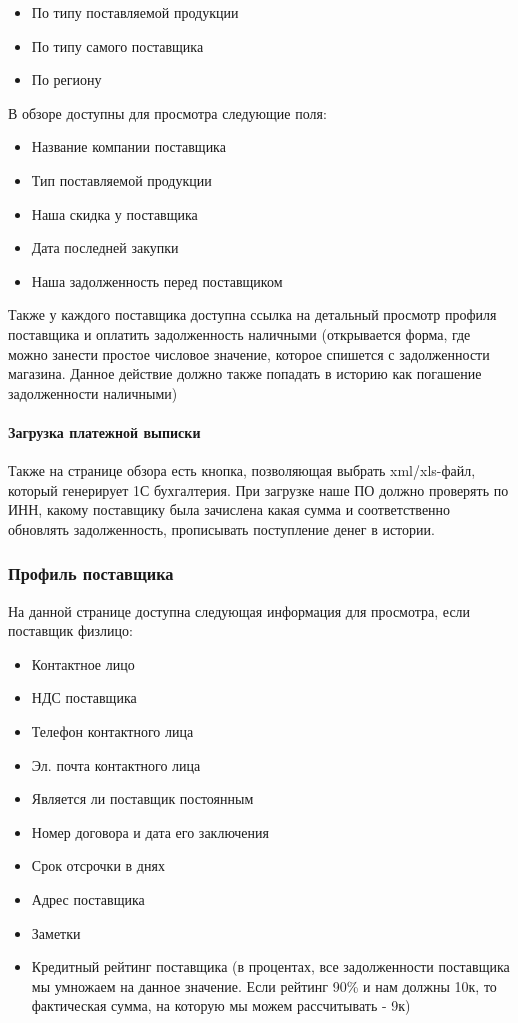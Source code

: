 \documentclass[DIV=calc, paper=a4, fontsize=11pt]{scrartcl} %
\begin{document}
\begin{itemize}
	\item По типу поставляемой продукции
	\item По типу самого поставщика 
	\item По региону
\end{itemize}

В обзоре доступны для просмотра следующие поля:

\begin{itemize}
	\item Название компании поставщика
	\item Тип поставляемой продукции
	\item Наша скидка у поставщика
	\item Дата последней закупки
	\item Наша задолженность перед поставщиком
\end{itemize}

Также у каждого поставщика доступна ссылка на детальный просмотр профиля поставщика и оплатить задолженность наличными (открывается форма, где можно занести простое числовое значение, которое спишется с задолженности магазина. Данное действие должно также попадать в историю как погашение задолженности наличными)

\paragraph{Загрузка платежной выписки}
Также на странице обзора есть кнопка, позволяющая выбрать xml/xls-файл, который генерирует 1С бухгалтерия. При загрузке наше ПО должно проверять по ИНН, какому поставщику была зачислена какая сумма и соответственно обновлять задолженность, прописывать поступление денег в истории.

\subsubsection{Профиль поставщика}

На данной странице доступна следующая информация для просмотра, если поставщик физлицо:

\begin{itemize}
	\item Контактное лицо
	\item НДС поставщика
	\item Телефон контактного лица
	\item Эл. почта контактного лица
	\item Является ли поставщик постоянным
	\item Номер договора и дата его заключения
	\item Срок отсрочки в днях
	\item Адрес поставщика
	\item Заметки
	\item Кредитный рейтинг поставщика (в процентах, все задолженности поставщика мы умножаем на данное значение. Если рейтинг 90\% и нам должны 10к, то фактическая сумма, на которую мы можем рассчитывать - 9к)
\end{itemize}
\end{document}
